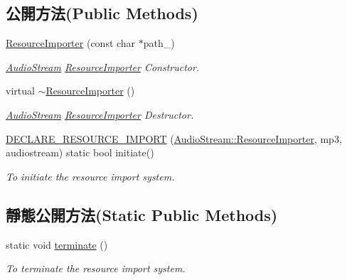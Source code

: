 \subsection*{公開方法(Public Methods)}
\begin{DoxyCompactItemize}
\item 
\hyperlink{class_magnum_1_1_audio_stream_1_1_resource_importer_abe26188d9a3aad81f19871252e88fd96}{Resource\+Importer} (const char $\ast$path\+\_\+)
\begin{DoxyCompactList}\small\item\em \hyperlink{class_magnum_1_1_audio_stream}{Audio\+Stream} \hyperlink{class_magnum_1_1_audio_stream_1_1_resource_importer}{Resource\+Importer} Constructor. \end{DoxyCompactList}\item 
virtual \hyperlink{class_magnum_1_1_audio_stream_1_1_resource_importer_acf0ed0201d8c1d0ae5d871c005fd8686}{$\sim$\+Resource\+Importer} ()
\begin{DoxyCompactList}\small\item\em \hyperlink{class_magnum_1_1_audio_stream}{Audio\+Stream} \hyperlink{class_magnum_1_1_audio_stream_1_1_resource_importer}{Resource\+Importer} Destructor. \end{DoxyCompactList}\item 
\hyperlink{class_magnum_1_1_audio_stream_1_1_resource_importer_a370f4b0fca83821ab680258ad6584d17}{D\+E\+C\+L\+A\+R\+E\+\_\+\+R\+E\+S\+O\+U\+R\+C\+E\+\_\+\+I\+M\+P\+O\+RT} (\hyperlink{class_magnum_1_1_audio_stream_1_1_resource_importer}{Audio\+Stream\+::\+Resource\+Importer}, mp3, audiostream) static bool initiate()\hypertarget{class_magnum_1_1_audio_stream_1_1_resource_importer_a370f4b0fca83821ab680258ad6584d17}{}\label{class_magnum_1_1_audio_stream_1_1_resource_importer_a370f4b0fca83821ab680258ad6584d17}

\begin{DoxyCompactList}\small\item\em To initiate the resource import system. \end{DoxyCompactList}\end{DoxyCompactItemize}
\subsection*{靜態公開方法(Static Public Methods)}
\begin{DoxyCompactItemize}
\item 
static void \hyperlink{class_magnum_1_1_audio_stream_1_1_resource_importer_adbd206e0953512e1db73d6bf7c9fcc9c}{terminate} ()\hypertarget{class_magnum_1_1_audio_stream_1_1_resource_importer_adbd206e0953512e1db73d6bf7c9fcc9c}{}\label{class_magnum_1_1_audio_stream_1_1_resource_importer_adbd206e0953512e1db73d6bf7c9fcc9c}

\begin{DoxyCompactList}\small\item\em To terminate the resource import system. \end{DoxyCompactList}\end{DoxyCompactItemize}
